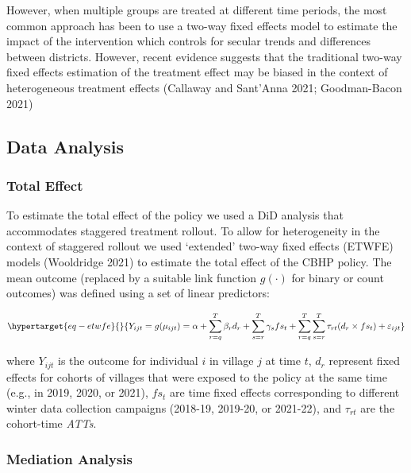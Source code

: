 \documentclass[
  letterpaper,
  DIV=11,
  numbers=noendperiod]{scrartcl}
\begin{document}
However, when multiple groups are treated at different time periods, the
most common approach has been to use a two-way fixed effects model to
estimate the impact of the intervention which controls for secular
trends and differences between districts. However, recent evidence
suggests that the traditional two-way fixed effects estimation of the
treatment effect may be biased in the context of heterogeneous treatment
effects (Callaway and Sant'Anna 2021; Goodman-Bacon 2021)

\hypertarget{data-analysis}{%
\subsection{Data Analysis}\label{data-analysis}}

\hypertarget{total-effect}{%
\subsubsection{Total Effect}\label{total-effect}}

To estimate the total effect of the policy we used a DiD analysis that
accommodates staggered treatment rollout. To allow for heterogeneity in
the context of staggered rollout we used `extended' two-way fixed
effects (ETWFE) models (Wooldridge 2021) to estimate the total effect of
the CBHP policy. The mean outcome (replaced by a suitable link function
\(g(\cdot)\) for binary or count outcomes) was defined using a set of
linear predictors:

\begin{equation}\protect\hypertarget{eq-etwfe}{}{Y_{ijt}=g(\mu_{ijt}) = \alpha + \sum_{r=q}^{T} \beta_{r} d_{r} + \sum_{s=r}^{T} \gamma_{s} fs_{t}+ \sum_{r=q}^{T} \sum_{s=r}^{T} \tau_{rt} (d_{r} \times fs_{t}) + \varepsilon_{ijt}}\label{eq-etwfe}\end{equation}

where \(Y_{ijt}\) is the outcome for individual \(i\) in village \(j\)
at time \(t\), \(d_{r}\) represent fixed effects for cohorts of villages
that were exposed to the policy at the same time (e.g., in 2019, 2020,
or 2021), \(fs_{t}\) are time fixed effects corresponding to different
winter data collection campaigns (2018-19, 2019-20, or 2021-22), and
\(\tau_{rt}\) are the cohort-time \emph{ATTs}.

\hypertarget{mediation-analysis}{%
\subsubsection{Mediation Analysis}\label{mediation-analysis}}
\end{document}
